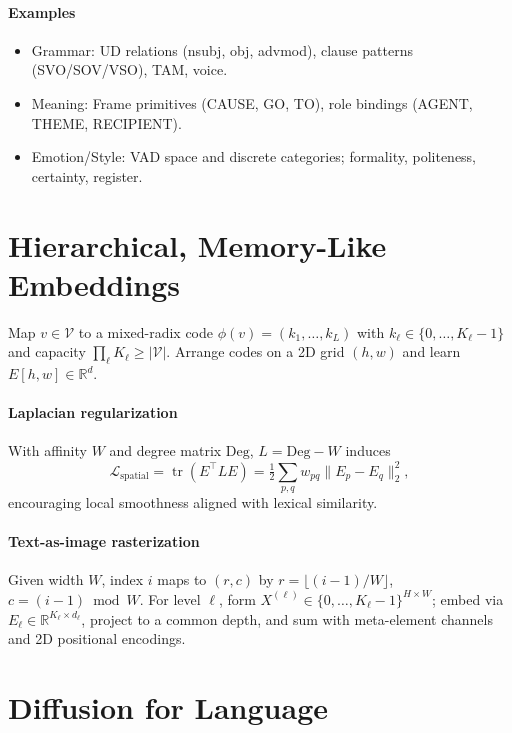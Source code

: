 \documentclass[11pt]{article}
\begin{document}
\paragraph{Examples}
\begin{itemize}[noitemsep,topsep=2pt]
  \item Grammar: UD relations (nsubj, obj, advmod), clause patterns (SVO/SOV/VSO), TAM, voice.
  \item Meaning: Frame primitives (CAUSE, GO, TO), role bindings (AGENT, THEME, RECIPIENT).
  \item Emotion/Style: VAD space and discrete categories; formality, politeness, certainty, register.
\end{itemize}

\section{Hierarchical, Memory-Like Embeddings}
Map $v\in\mathcal{V}$ to a mixed-radix code $\phi(v){=}(k_1,\ldots,k_L)$ with $k_\ell\in\{0,\ldots,K_\ell{-}1\}$ and capacity $\prod_\ell K_\ell\ge |\mathcal{V}|$. Arrange codes on a 2D grid $(h,w)$ and learn $E[h,w]\in\mathbb{R}^d$.

\paragraph{Laplacian regularization}
With affinity $W$ and degree matrix $\mathrm{Deg}$, $L{=}\mathrm{Deg}{-}W$ induces
\begin{equation}
\mathcal{L}_{\text{spatial}}=\operatorname{tr}(E^\top L E)=\tfrac{1}{2}\sum_{p,q}w_{pq}\|E_p{-}E_q\|_2^2,
\end{equation}
encouraging local smoothness aligned with lexical similarity.

\paragraph{Text-as-image rasterization}
Given width $W$, index $i$ maps to $(r,c)$ by $r{=}\lfloor (i{-}1)/W \rfloor$, $c{=}(i{-}1)\bmod W$. For level $\ell$, form $X^{(\ell)}\in\{0,\ldots,K_\ell{-}1\}^{H\times W}$; embed via $E_\ell\in\mathbb{R}^{K_\ell\times d_\ell}$, project to a common depth, and sum with meta-element channels and 2D positional encodings.

\section{Diffusion for Language}
\end{document}
